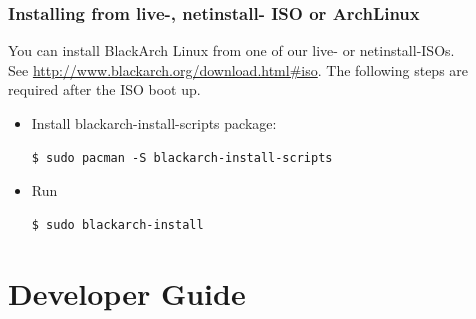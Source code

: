 \documentclass[a4paper, oneside, 11pt]{book}
\begin{document}
\subsection{Installing from live-, netinstall- ISO or ArchLinux}
You can install BlackArch Linux from one of our live- or netinstall-ISOs.\\See
\url{http://www.blackarch.org/download.html#iso}. The following steps are
required after the ISO boot up.
\begin{itemize}
\item Install blackarch-install-scripts package:
{\small
\color{gray}
\begin{verbatim}
$ sudo pacman -S blackarch-install-scripts
\end{verbatim}
}
\item Run
{\small
\color{gray}
\begin{verbatim}
$ sudo blackarch-install
\end{verbatim}
}
\end{itemize}


\chapter{Developer Guide}






\end{document}
